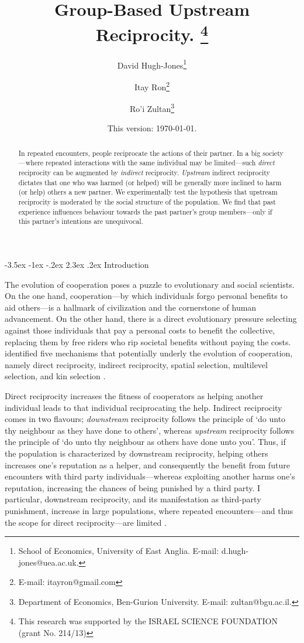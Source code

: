 \documentclass[12pt,a4paper]{article}
\title{\bf\sffamily %
Group-Based Upstream Reciprocity.%
\thanks{
This research was supported by the ISRAEL SCIENCE FOUNDATION (grant No. 214/13)
}}
\author{David Hugh-Jones\thanks{School of Economics, University of East Anglia. E-mail: d.hugh-jones@uea.ac.uk.} \and Itay Ron\thanks{E-mail: itayron@gmail.com} \and Ro'i Zultan\thanks{Department of Economics, Ben-Gurion University. E-mail: zultan@bgu.ac.il.}}
\date{\sffamily \small This version: \today.} %
\makeatletter
\renewcommand\section{\@startsection {section}{1}{\z@}%
{-3.5ex \@plus -1ex \@minus -.2ex}%
{2.3ex \@plus.2ex}%
{\bf\sffamily\Large}}
\makeatother
\begin{document}
\maketitle

\begin{abstract}
In repeated encounters, people reciprocate the actions of their partner.
In a big society---where repeated interactions with the same individual may be limited---such \emph{direct} reciprocity can be augmented by \emph{indirect} reciprocity. \emph{Upstream} indirect reciprocity dictates that one who was harmed (or helped) will be generally more inclined to harm (or help) others a new partner. We experimentally test the hypothesis that upstream reciprocity is moderated by the social structure of the population. We find that past experience influences behaviour towards the past partner's group members---only if this partner's intentions are unequivocal.
\end{abstract}

\section{Introduction}

The evolution of cooperation poses a puzzle to evolutionary and social scientists. On the one hand, cooperation---by which individuals forgo personal benefits to aid others---is a hallmark of civilization and the cornerstone of human advancement. On the other hand, there is a direct evolutionary pressure selecting against those individuals that pay a personal costs to benefit the collective, replacing them by free riders who rip societal benefits without paying the costs. \citet{nowak2006five,nowak2012evolving} identified five mechanisms that potentially underly the evolution of cooperation, namely direct reciprocity, indirect reciprocity, spatial selection, multilevel selection, and kin selection \citep*[see][for an extended treatment]{nowak2011supercooperators}.

Direct reciprocity increases the fitness of cooperators as helping another individual leads to that individual reciprocating the help.
Indirect reciprocity comes in two flavours; \emph{downstream} reciprocity follows the principle of `do unto thy neighbour as they have done to others', whereas \emph{upstream} reciprocity follows the principle of `do unto thy neighbour as others have done unto you'. Thus, if the population is characterized by downstream reciprocity, helping others increases one's reputation as a helper, and consequently the benefit from future encounters with third party individuals---whereas exploiting another harms one's reputation, increasing the chances of being punished by a third party. I particular, downstream reciprocity, and its manifestation as third-party punishment, increase in large populations, where repeated encounters---and thus the scope for direct reciprocity---are limited \citep*{marlowe2008more}.
\end{document}
